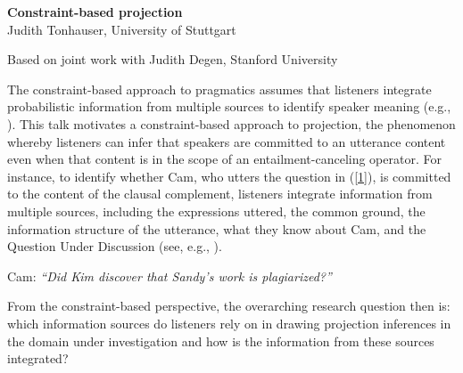 \documentclass[12pt,fleqn]{article}
\newcommand{\6}{\mbox{$[\hspace*{-.6mm}[$}}
\newcommand{\9}{\mbox{$]\hspace*{-.6mm}]$}}
\begin{document}
 

\begin{center}
{\bf Constraint-based projection}
\\ Judith Tonhauser, University of Stuttgart
\end{center}

\vspace*{.5cm}

\noindent
Based on joint work with Judith Degen, Stanford University

\vspace*{.5cm}
\noindent
The constraint-based approach to pragmatics assumes that listeners integrate probabilistic information from multiple sources to identify speaker meaning (e.g., \citealt{degen-tanenhaus2019}). This talk motivates a constraint-based approach to projection, the phenomenon whereby listeners can infer that speakers are committed to an utterance content even when that content is in the scope of an entailment-canceling operator. For instance, to identify whether Cam, who utters the question in (\ref{1}), is committed to the content of the clausal complement, listeners integrate information from multiple sources, including the expressions uttered, the common ground, the information structure of the utterance, what they know about Cam, and the Question Under Discussion (see, e.g., \citealt{beaver-belly,brst-ar,cummins-rohde2015,djaerv-bacovcin-salt27,mahler2020,brst-salt10,best-question,tonhauser-salt26,tonhauser-guarani-variability,tbd-variability,tonhauser-etal-sub23}).

\begin{exe}
\ex\label{1} Cam: {\em ``Did Kim discover that Sandy's work is plagiarized?''}
\end{exe}

From the constraint-based perspective, the overarching research question then is: which information sources do listeners rely on in drawing projection inferences in the domain under investigation and how is the information from these sources integrated?
\end{document}

